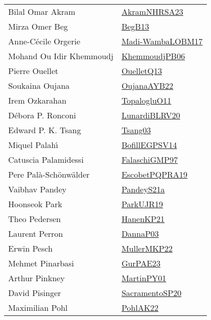 {\begin{longtable}{p{4cm}p{20cm}}
Bilal Omar Akram & \href{articles/AkramNHRSA23.pdf}{AkramNHRSA23}\cite{AkramNHRSA23} \\
Mirza Omer Beg & \href{}{BegB13}\cite{BegB13} \\
Anne{-}C{\'{e}}cile Orgerie & \href{papers/Madi-WambaLOBM17.pdf}{Madi-WambaLOBM17}\cite{Madi-WambaLOBM17} \\
Mohand Ou Idir Khemmoudj & \href{papers/KhemmoudjPB06.pdf}{KhemmoudjPB06}\cite{KhemmoudjPB06} \\
Pierre Ouellet & \href{papers/OuelletQ13.pdf}{OuelletQ13}\cite{OuelletQ13} \\
Soukaina Oujana & \href{papers/OujanaAYB22.pdf}{OujanaAYB22}\cite{OujanaAYB22} \\
Irem Ozkarahan & \href{articles/TopalogluO11.pdf}{TopalogluO11}\cite{TopalogluO11} \\
D{\'{e}}bora P. Ronconi & \href{articles/LunardiBLRV20.pdf}{LunardiBLRV20}\cite{LunardiBLRV20} \\
Edward P. K. Tsang & \href{articles/Tsang03.pdf}{Tsang03}\cite{Tsang03} \\
Miquel Palah{\'{\i}} & \href{papers/BofillEGPSV14.pdf}{BofillEGPSV14}\cite{BofillEGPSV14} \\
Catuscia Palamidessi & \href{articles/FalaschiGMP97.pdf}{FalaschiGMP97}\cite{FalaschiGMP97} \\
Pere Pal{\`{a}}{-}Sch{\"{o}}nw{\"{a}}lder & \href{articles/EscobetPQPRA19.pdf}{EscobetPQPRA19}\cite{EscobetPQPRA19} \\
Vaibhav Pandey & \href{articles/PandeyS21a.pdf}{PandeyS21a}\cite{PandeyS21a} \\
Hoonseok Park & \href{papers/ParkUJR19.pdf}{ParkUJR19}\cite{ParkUJR19} \\
Theo Pedersen & \href{papers/HanenKP21.pdf}{HanenKP21}\cite{HanenKP21} \\
Laurent Perron & \href{papers/DannaP03.pdf}{DannaP03}\cite{DannaP03} \\
Erwin Pesch & \href{articles/MullerMKP22.pdf}{MullerMKP22}\cite{MullerMKP22} \\
Mehmet Pinarbasi & \href{articles/GurPAE23.pdf}{GurPAE23}\cite{GurPAE23} \\
Arthur Pinkney & \href{articles/MartinPY01.pdf}{MartinPY01}\cite{MartinPY01} \\
David Pisinger & \href{articles/SacramentoSP20.pdf}{SacramentoSP20}\cite{SacramentoSP20} \\
Maximilian Pohl & \href{articles/PohlAK22.pdf}{PohlAK22}\cite{PohlAK22} \\

\end{longtable}}
